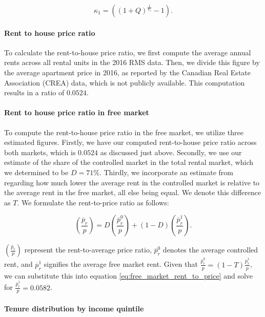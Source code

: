 \documentclass[parskip=full]{article}
\begin{document}
\begin{equation}\label{eq:computing_annual_decrease}
    \kappa_{1}=((1+Q)^{\frac{1}{Y_{c}}}-1).
\end{equation}

\paragraph{Rent to house price ratio}

To calculate the rent-to-house price ratio, we first compute the average annual rents across all rental units in the 2016 RMS data. Then, we divide this figure by the average apartment price in 2016, as reported by the Canadian Real Estate Association (CREA) data, which is not publicly available. This computation results in a ratio of $0.0524$.

\paragraph{Rent to house price ratio in free market}

To compute the rent-to-house price ratio in the free market, we utilize three estimated figures. Firstly, we have our computed rent-to-house price ratio across both markets, which is $0.0524$ as discussed just above. Secondly, we use our estimate of the share of the controlled market in the total rental market, which we determined to be $D=71\%$. Thirdly, we incorporate an estimate from \citet{zhang-gou} regarding how much lower the average rent in the controlled market is relative to the average rent in the free market, all else being equal. We denote this difference as $T$. We formulate the rent-to-price ratio as follows:

\begin{equation}\label{eq:free_market_rent_to_price}
    {\left(\frac{\overline{p}_{r}}{p}\right)}=D \left(\frac{\overline{p}^{0}_{r}}{p}\right)+(1-D) \left(\frac{\overline{p}^{1}_{r}}{p}\right).
\end{equation}

\noindent $\left(\frac{\overline{p}_{r}}{p}\right)$ represent the rent-to-average price ratio, $\overline{p}^{0}_{r}$ denotes the average controlled rent, and $\overline{p}^{1}_{r}$ signifies the average free market rent. Given that $\frac{\overline{p}^{0}_{r}}{p}=(1-T)\frac{\overline{p}^{1}_{r}}{p}$, we can substitute this into equation \eqref{eq:free_market_rent_to_price} and solve for $\frac{\overline{p}^{1}_{r}}{p}=0.0582$.

\paragraph{Tenure distribution by income quintile}
\end{document}
